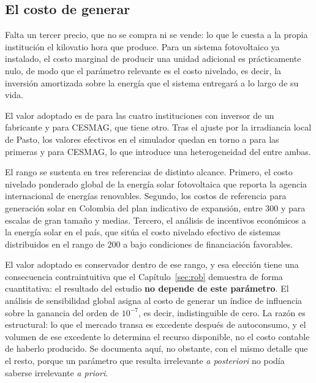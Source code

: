 \subsection{El costo de generar}
\label{sub:precios-lcoe}

Falta un tercer precio, que no se compra ni se vende: lo que le cuesta a
la propia institución el kilovatio hora que produce. Para un sistema
fotovoltaico ya instalado, el costo marginal de producir una unidad
adicional es prácticamente nulo, de modo que el parámetro relevante es el
costo nivelado, es decir, la inversión amortizada sobre la energía que el
sistema entregará a lo largo de su vida.

El valor adoptado es de  para las cuatro instituciones
con inversor de un fabricante y  para CESMAG, que tiene otro.
Tras el ajuste por la irradiancia local de Pasto, los valores efectivos en
el simulador quedan en torno a  para las primeras y
 para CESMAG, lo que introduce una heterogeneidad del
 entre ambas.

El rango se sustenta en tres referencias de distinto alcance. Primero,
el costo nivelado ponderado global de la energía solar fotovoltaica que
reporta la agencia internacional de energías renovables. Segundo, los
costos de referencia para generación solar en Colombia del plan indicativo
de expansión, entre \num{300} y  para escalas de gran
tamaño y medias. Tercero, el análisis de incentivos económicos a la
energía solar en el país, que sitúa el costo nivelado efectivo de sistemas
distribuidos en el rango de \num{200} a  bajo
condiciones de financiación favorables.

\begin{detallebox}
El valor adoptado es conservador dentro de ese rango, y esa elección tiene
una consecuencia contraintuitiva que el Capítulo~\ref{sec:rob} demuestra
de forma cuantitativa: el resultado del estudio \textbf{no depende de este
parámetro}. El análisis de sensibilidad global asigna al costo de generar
un índice de influencia sobre la ganancia del orden de $10^{-7}$, es decir,
indistinguible de cero. La razón es estructural: lo que el mercado transa
es excedente después de autoconsumo, y el volumen de ese excedente lo
determina el recurso disponible, no el costo contable de haberlo
producido. Se documenta aquí, no obstante, con el mismo detalle que el
resto, porque un parámetro que resulta irrelevante \emph{a posteriori} no
podía saberse irrelevante \emph{a priori}.
\end{detallebox}


